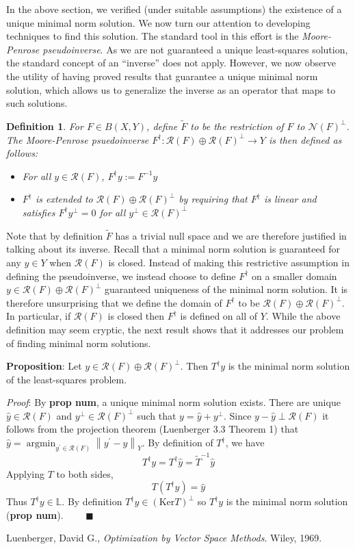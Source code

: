 \documentclass[12pt]{article}
\newcommand*{\norm}[1]{\left\lVert#1\right\rVert}
\newcommand{\R}{\mathcal{R}}
\newcommand{\N}{\mathcal{N}}
\newcommand{\Ker}{\mathrm{Ker}}
\DeclareMathOperator*{\argmin}{argmin}
\newtheorem{definition}{Definition}
\begin{document}
In the above section, we verified (under suitable assumptions) the existence of a unique minimal norm solution. 
We now turn our attention to developing techniques to find this solution. The standard tool in this effort is the 
\textit{Moore-Penrose pseudoinverse}. As we are not guaranteed a unique least-squares solution, 
the standard concept of an ``inverse'' does not apply. However, we now observe the utility of having 
proved results that guarantee a unique minimal norm solution, which allows us to generalize the 
inverse as an operator that maps to such solutions. 
 
 \begin{definition} 
 For $F \in B(X, Y)$, define $\tilde{F}$ to be the restriction of $F$ to $\N(F)^\perp$. The Moore-Penrose psuedoinverse $F^\dagger : \R(F) \oplus \R(F)^\perp \to Y$ is then defined as follows: 
 \begin{itemize} 
 \item For all $y \in \R(F)$, $F^\dagger y := F^{-1}y$
 \item $F^\dagger$ is extended to $\R(F) \oplus \R(F)^\perp$ by requiring that $F^\dagger$ is linear and satisfies $F^\dagger y^\perp = 0$ for all $y^\perp \in \R(F)^\perp$
 \end{itemize} 
 \end{definition} 
 
Note that by definition $\tilde{F}$ has a trivial null space and we are therefore justified in talking 
about its inverse. Recall that a minimal norm solution is guaranteed for any $y \in Y$ when $\R(F)$ is closed. 
Instead of making this restrictive assumption in defining the pseudoinverse, we instead choose to define 
 $F^\dagger$ on a smaller domain $y \in \R(F) \oplus \R(F)^\perp$ 
guaranteed uniqueness of the minimal norm solution. It is therefore unsurprising that we define the 
domain of $F^\dagger$ to be $\R(F) \oplus \R(F)^\perp$. In particular, if $\R(F)$ is closed then $F^\dagger$ 
is defined on all of $Y$. While the above definition may seem cryptic, the next result shows that it addresses
 our problem of finding minimal norm solutions.

\textbf{Proposition}: Let $y \in \R(F) \oplus \R(F)^\perp$. Then $T^\dagger y$ is the minimal norm solution of the least-squares problem. 

\smallskip 

\textit{Proof}: By \textbf{prop num}, a unique minimal norm solution exists. There are unique $\hat{y} \in \R(F)$ and $y^\perp \in \R(F)^\perp$ such that $y = \hat{y} + y^\perp$. Since $y - \hat{y} \perp \R(F)$ it follows from the projection theorem (Luenberger 3.3 Theorem 1) that $\hat{y} = \argmin_{y^\prime \in \R(F)} \norm{y^\prime - y}_Y$. By definition of $T^\dagger$, we have \[T^\dagger y = T^\dagger \hat{y} = \tilde{T}^{-1}\hat{y}\]
 Applying $T$ to both sides, \[T(T^\dagger y) = \hat{y}\]
 Thus $T^\dagger y \in \mathbb{L}$. By definition $T^\dagger y \in (\Ker T)^\perp$ so $T^\dagger y$ is the minimal norm solution (\textbf{prop num}). $\qquad \blacksquare$
 
 
\begin{thebibliography}{20}

  Luenberger, David G., \textit{Optimization by Vector Space Methods}. Wiley, 1969. 

\end{thebibliography}
 
\end{document}
